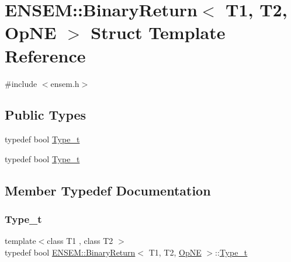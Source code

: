 \hypertarget{structENSEM_1_1BinaryReturn_3_01T1_00_01T2_00_01OpNE_01_4}{}\section{E\+N\+S\+EM\+:\+:Binary\+Return$<$ T1, T2, Op\+NE $>$ Struct Template Reference}
\label{structENSEM_1_1BinaryReturn_3_01T1_00_01T2_00_01OpNE_01_4}


{\ttfamily \#include $<$ensem.\+h$>$}

\subsection*{Public Types}
\begin{DoxyCompactItemize}
\item 
typedef bool \mbox{\hyperlink{structENSEM_1_1BinaryReturn_3_01T1_00_01T2_00_01OpNE_01_4_a9da65a077e200526d6270d806c19dcd6}{Type\+\_\+t}}
\item 
typedef bool \mbox{\hyperlink{structENSEM_1_1BinaryReturn_3_01T1_00_01T2_00_01OpNE_01_4_a9da65a077e200526d6270d806c19dcd6}{Type\+\_\+t}}
\end{DoxyCompactItemize}


\subsection{Member Typedef Documentation}
\mbox{\label{structENSEM_1_1BinaryReturn_3_01T1_00_01T2_00_01OpNE_01_4_a9da65a077e200526d6270d806c19dcd6}} 
\subsubsection{\texorpdfstring{Type\_t}{Type\_t}\hspace{0.1cm}{\footnotesize\ttfamily [1/2]}}
{\footnotesize\ttfamily template$<$class T1 , class T2 $>$ \\
typedef bool \mbox{\hyperlink{structENSEM_1_1BinaryReturn}{E\+N\+S\+E\+M\+::\+Binary\+Return}}$<$ T1, T2, \mbox{\hyperlink{structENSEM_1_1OpNE}{Op\+NE}} $>$\+::\mbox{\hyperlink{structENSEM_1_1BinaryReturn_3_01T1_00_01T2_00_01OpNE_01_4_a9da65a077e200526d6270d806c19dcd6}{Type\+\_\+t}}}


